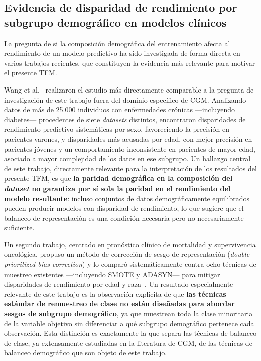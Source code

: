 \subsection{Evidencia de disparidad de rendimiento por subgrupo demográfico en modelos clínicos}
\label{subsec:evidencia_disparidad_rendimiento}

La pregunta de si la composición demográfica del entrenamiento afecta al rendimiento de un modelo predictivo ha sido investigada de forma directa en varios trabajos recientes, que constituyen la evidencia más relevante para motivar el presente TFM.

Wang et al.~\cite{wang2024disparate} realizaron el estudio más directamente comparable a la pregunta de investigación de este trabajo fuera del dominio específico de CGM. Analizando datos de más de 25.000 individuos con enfermedades crónicas —incluyendo diabetes— procedentes de siete \emph{datasets} distintos, encontraron disparidades de rendimiento predictivo sistemáticas por sexo, favoreciendo la precisión en pacientes varones, y disparidades más acusadas por edad, con mejor precisión en pacientes jóvenes y un comportamiento inconsistente en pacientes de mayor edad, asociado a mayor complejidad de los datos en ese subgrupo. Un hallazgo central de este trabajo, directamente relevante para la interpretación de los resultados del presente TFM, es que \textbf{la paridad demográfica en la composición del \emph{dataset} no garantiza por sí sola la paridad en el rendimiento del modelo resultante}: incluso conjuntos de datos demográficamente equilibrados pueden producir modelos con disparidad de rendimiento, lo que sugiere que el balanceo de representación es una condición necesaria pero no necesariamente suficiente.

Un segundo trabajo, centrado en pronóstico clínico de mortalidad y supervivencia oncológica, propuso un método de corrección de sesgo de representación (\emph{double prioritized bias correction}) y lo comparó sistemáticamente contra ocho técnicas de muestreo existentes —incluyendo SMOTE y ADASYN— para mitigar disparidades de rendimiento por edad y raza~\cite{yan2022doubleprioritized}. Un resultado especialmente relevante de este trabajo es la observación explícita de que \textbf{las técnicas estándar de remuestreo de clase no están diseñadas para abordar sesgos de subgrupo demográfico}, ya que muestrean toda la clase minoritaria de la variable objetivo sin diferenciar a qué subgrupo demográfico pertenece cada observación. Esta distinción es exactamente la que separa las técnicas de balanceo de clase, ya extensamente estudiadas en la literatura de CGM, de las técnicas de balanceo demográfico que son objeto de este trabajo.

